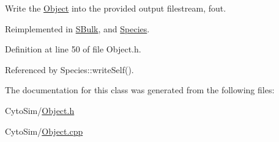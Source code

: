 Write the \hyperlink{classObject}{Object} into the provided output filestream, fout. 



Reimplemented in \hyperlink{classSBulk_af96d228dfe5348a5a7944b69c3ddf8fa}{S\-Bulk}, and \hyperlink{classSpecies_a8a2ec8930dd89c427245f0013aea9c69}{Species}.



Definition at line 50 of file Object.\-h.



Referenced by Species\-::write\-Self().



The documentation for this class was generated from the following files\-:\begin{DoxyCompactItemize}
\item 
Cyto\-Sim/\hyperlink{Object_8h}{Object.\-h}\item 
Cyto\-Sim/\hyperlink{Object_8cpp}{Object.\-cpp}\end{DoxyCompactItemize}
